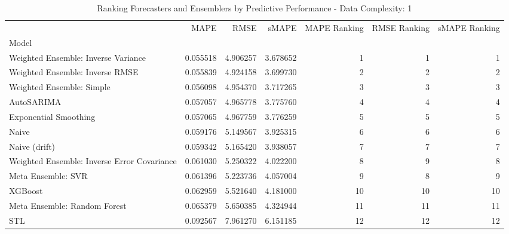 \begin{table}
\caption{Ranking Forecasters and Ensemblers by Predictive Performance - Data Complexity: 1}
\begin{tabular}{lrrrrrr}
\toprule
 & MAPE & RMSE & sMAPE & MAPE Ranking & RMSE Ranking & sMAPE Ranking \\
Model &  &  &  &  &  &  \\
\midrule
Weighted Ensemble: Inverse Variance & 0.055518 & 4.906257 & 3.678652 & 1 & 1 & 1 \\
Weighted Ensemble: Inverse RMSE & 0.055839 & 4.924158 & 3.699730 & 2 & 2 & 2 \\
Weighted Ensemble: Simple & 0.056098 & 4.954370 & 3.717265 & 3 & 3 & 3 \\
AutoSARIMA & 0.057057 & 4.965778 & 3.775760 & 4 & 4 & 4 \\
Exponential Smoothing & 0.057065 & 4.967759 & 3.776259 & 5 & 5 & 5 \\
Naive & 0.059176 & 5.149567 & 3.925315 & 6 & 6 & 6 \\
Naive (drift) & 0.059342 & 5.165420 & 3.938057 & 7 & 7 & 7 \\
Weighted Ensemble: Inverse Error Covariance & 0.061030 & 5.250322 & 4.022200 & 8 & 9 & 8 \\
Meta Ensemble: SVR & 0.061396 & 5.223736 & 4.057004 & 9 & 8 & 9 \\
XGBoost & 0.062959 & 5.521640 & 4.181000 & 10 & 10 & 10 \\
Meta Ensemble: Random Forest & 0.065379 & 5.650385 & 4.324944 & 11 & 11 & 11 \\
STL & 0.092567 & 7.961270 & 6.151185 & 12 & 12 & 12 \\
\bottomrule
\end{tabular}
\end{table}
